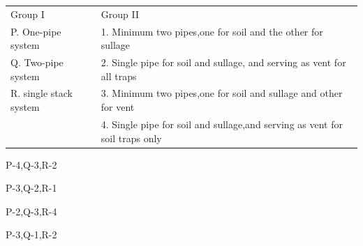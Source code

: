 \documentclass[journal,12pt,onecolumn]{IEEEtran}
\theoremstyle{remark}
\begin{document}
\begin{enumerate}
 \newline
 \begin{tabular}{p{}p{}}
  Group I    & Group II  \\
 P. One-pipe system     &1. Minimum two pipes,one for soil and the other for sullage\\
 Q. Two-pipe system & 2. Single pipe for soil and sullage, and serving as vent for all traps\\
 R. single stack system &3. Minimum two pipes,one for soil and sullage and other for vent\\
   &4. Single pipe for soil and sullage,and serving as vent for soil traps only\\
 \end{tabular}
\begin{enumerate}
\begin{multicols}{2}
  \item P-4,Q-3,R-2
  \item P-3,Q-2,R-1
  \item P-2,Q-3,R-4
  \item P-3,Q-1,R-2
    

\end{multicols}
\end{enumerate}
\end{enumerate}
\end{document}
